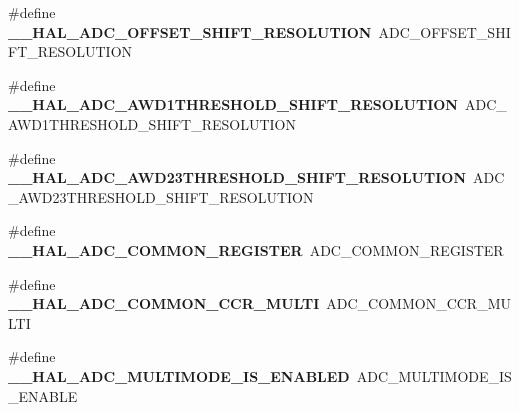 \begin{DoxyCompactItemize}
\item 
\hypertarget{group___h_a_l___a_d_c___aliased___macros_ga0f83fc077ad488745139c8e24641d437}{\#define {\bfseries \-\_\-\-\_\-\-H\-A\-L\-\_\-\-A\-D\-C\-\_\-\-O\-F\-F\-S\-E\-T\-\_\-\-S\-H\-I\-F\-T\-\_\-\-R\-E\-S\-O\-L\-U\-T\-I\-O\-N}~A\-D\-C\-\_\-\-O\-F\-F\-S\-E\-T\-\_\-\-S\-H\-I\-F\-T\-\_\-\-R\-E\-S\-O\-L\-U\-T\-I\-O\-N}\label{group___h_a_l___a_d_c___aliased___macros_ga0f83fc077ad488745139c8e24641d437}

\item 
\hypertarget{group___h_a_l___a_d_c___aliased___macros_ga616002cefa3a1ba7af4fa612afd02561}{\#define {\bfseries \-\_\-\-\_\-\-H\-A\-L\-\_\-\-A\-D\-C\-\_\-\-A\-W\-D1\-T\-H\-R\-E\-S\-H\-O\-L\-D\-\_\-\-S\-H\-I\-F\-T\-\_\-\-R\-E\-S\-O\-L\-U\-T\-I\-O\-N}~A\-D\-C\-\_\-\-A\-W\-D1\-T\-H\-R\-E\-S\-H\-O\-L\-D\-\_\-\-S\-H\-I\-F\-T\-\_\-\-R\-E\-S\-O\-L\-U\-T\-I\-O\-N}\label{group___h_a_l___a_d_c___aliased___macros_ga616002cefa3a1ba7af4fa612afd02561}

\item 
\hypertarget{group___h_a_l___a_d_c___aliased___macros_ga4038d6abc1b95e035a2a0b51fb999db2}{\#define {\bfseries \-\_\-\-\_\-\-H\-A\-L\-\_\-\-A\-D\-C\-\_\-\-A\-W\-D23\-T\-H\-R\-E\-S\-H\-O\-L\-D\-\_\-\-S\-H\-I\-F\-T\-\_\-\-R\-E\-S\-O\-L\-U\-T\-I\-O\-N}~A\-D\-C\-\_\-\-A\-W\-D23\-T\-H\-R\-E\-S\-H\-O\-L\-D\-\_\-\-S\-H\-I\-F\-T\-\_\-\-R\-E\-S\-O\-L\-U\-T\-I\-O\-N}\label{group___h_a_l___a_d_c___aliased___macros_ga4038d6abc1b95e035a2a0b51fb999db2}

\item 
\hypertarget{group___h_a_l___a_d_c___aliased___macros_ga00ebbedf4015e4538720e7a6dbacce59}{\#define {\bfseries \-\_\-\-\_\-\-H\-A\-L\-\_\-\-A\-D\-C\-\_\-\-C\-O\-M\-M\-O\-N\-\_\-\-R\-E\-G\-I\-S\-T\-E\-R}~A\-D\-C\-\_\-\-C\-O\-M\-M\-O\-N\-\_\-\-R\-E\-G\-I\-S\-T\-E\-R}\label{group___h_a_l___a_d_c___aliased___macros_ga00ebbedf4015e4538720e7a6dbacce59}

\item 
\hypertarget{group___h_a_l___a_d_c___aliased___macros_ga8bf50f7c58849d4cd141a421d55b148d}{\#define {\bfseries \-\_\-\-\_\-\-H\-A\-L\-\_\-\-A\-D\-C\-\_\-\-C\-O\-M\-M\-O\-N\-\_\-\-C\-C\-R\-\_\-\-M\-U\-L\-T\-I}~A\-D\-C\-\_\-\-C\-O\-M\-M\-O\-N\-\_\-\-C\-C\-R\-\_\-\-M\-U\-L\-T\-I}\label{group___h_a_l___a_d_c___aliased___macros_ga8bf50f7c58849d4cd141a421d55b148d}

\item 
\hypertarget{group___h_a_l___a_d_c___aliased___macros_ga79f75f2e379c482c38441c050efc7225}{\#define {\bfseries \-\_\-\-\_\-\-H\-A\-L\-\_\-\-A\-D\-C\-\_\-\-M\-U\-L\-T\-I\-M\-O\-D\-E\-\_\-\-I\-S\-\_\-\-E\-N\-A\-B\-L\-E\-D}~A\-D\-C\-\_\-\-M\-U\-L\-T\-I\-M\-O\-D\-E\-\_\-\-I\-S\-\_\-\-E\-N\-A\-B\-L\-E}\label{group___h_a_l___a_d_c___aliased___macros_ga79f75f2e379c482c38441c050efc7225}


\end{DoxyCompactItemize}
